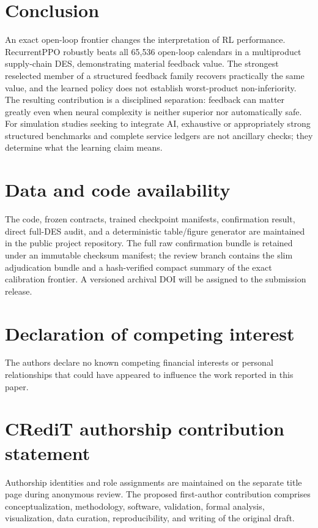 \documentclass[preprint,12pt]{elsarticle}
\begin{document}
\section{Conclusion}

An exact open-loop frontier changes the interpretation of RL performance. RecurrentPPO robustly beats all 65,536 open-loop calendars in a multiproduct supply-chain DES, demonstrating material feedback value. The strongest reselected member of a structured feedback family recovers practically the same value, and the learned policy does not establish worst-product non-inferiority. The resulting contribution is a disciplined separation: feedback can matter greatly even when neural complexity is neither superior nor automatically safe. For simulation studies seeking to integrate AI, exhaustive or appropriately strong structured benchmarks and complete service ledgers are not ancillary checks; they determine what the learning claim means.

\section*{Data and code availability}

The code, frozen contracts, trained checkpoint manifests, confirmation result, direct full-DES audit, and a deterministic table/figure generator are maintained in the public project repository. The full raw confirmation bundle is retained under an immutable checksum manifest; the review branch contains the slim adjudication bundle and a hash-verified compact summary of the exact calibration frontier. A versioned archival DOI will be assigned to the submission release.

\section*{Declaration of competing interest}

The authors declare no known competing financial interests or personal relationships that could have appeared to influence the work reported in this paper.

\section*{CRediT authorship contribution statement}

Authorship identities and role assignments are maintained on the separate title page during anonymous review. The proposed first-author contribution comprises conceptualization, methodology, software, validation, formal analysis, visualization, data curation, reproducibility, and writing of the original draft.
\end{document}
